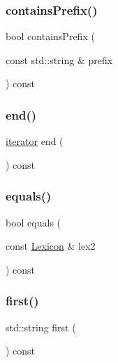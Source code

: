 \subsubsection{\texorpdfstring{contains\+Prefix()}{containsPrefix()}}
{\footnotesize\ttfamily bool contains\+Prefix (\begin{DoxyParamCaption}\item[{const std\+::string \&}]{prefix }\end{DoxyParamCaption}) const}

\mbox{\label{classLexicon_a68b688a51bd0cf6fb5bc2cba292209a8}} 
\subsubsection{\texorpdfstring{end()}{end()}}
{\footnotesize\ttfamily \mbox{\hyperlink{classLexicon_1_1iterator}{iterator}} end (\begin{DoxyParamCaption}{ }\end{DoxyParamCaption}) const\hspace{0.3cm}{\ttfamily [inline]}}

\mbox{\label{classLexicon_a7dd6de171cb80bc7e2b48d53bd1e9276}} 
\subsubsection{\texorpdfstring{equals()}{equals()}}
{\footnotesize\ttfamily bool equals (\begin{DoxyParamCaption}\item[{const \mbox{\hyperlink{classLexicon}{Lexicon}} \&}]{lex2 }\end{DoxyParamCaption}) const}

\mbox{\label{classLexicon_aba89eab0637bde14f9ded33e9e9c6aa5}} 
\subsubsection{\texorpdfstring{first()}{first()}}
{\footnotesize\ttfamily std\+::string first (\begin{DoxyParamCaption}{ }\end{DoxyParamCaption}) const}

